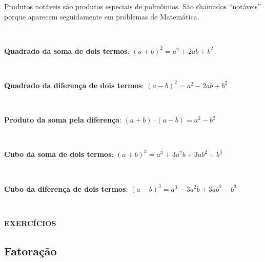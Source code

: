 Produtos notáveis são produtos especiais de polinômios. São chamados “notáveis” porque aparecem seguidamente em problemas de Matemática.

~~

\textbf{Quadrado da soma de dois termos}: $(a+b)^2 = a^2 + 2ab + b^2$

~~

\textbf{Quadrado da diferença de dois termos}: $(a - b)^2 = a^2 - 2ab + b^2$

~~

\textbf{Produto da soma pela diferença}: $(a + b) \cdot (a - b) = a^2 - b^2$

~~

\textbf{Cubo da soma de dois termos}: $(a + b)^3 = a^3 + 3a^2b + 3ab^2 + b^3$

~~

\textbf{Cubo da diferença de dois termos}: $(a - b)^3 = a^3 - 3a^2b + 3ab^2 - b^3$

~~

\noindent\textbf{EXERCÍCIOS \thesubsection}

\begin{enumerate}[label=\thesubsection.\alph*)]
\begin{multicols}{3}
    
    
    
    
    
    
    
    
    
    
    
    
    
    
\end{multicols}
\end{enumerate}

\subsection{Fatoração}

